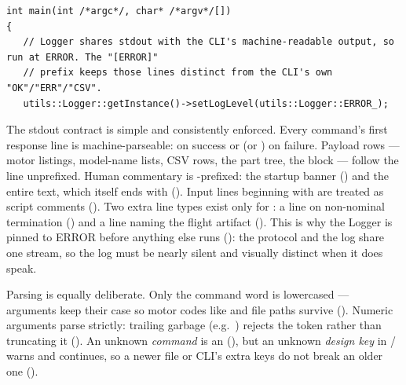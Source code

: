 \begin{listing}[htbp]
\begin{verbatim}
int main(int /*argc*/, char* /*argv*/[])
{
   // Logger shares stdout with the CLI's machine-readable output, so run at ERROR. The "[ERROR]"
   // prefix keeps those lines distinct from the CLI's own "OK"/"ERR"/"CSV".
   utils::Logger::getInstance()->setLogLevel(utils::Logger::ERROR_);
\end{verbatim}
\caption{The CLI's first act is pinning the Logger to ERROR: stdout is a protocol surface,
and log chatter would corrupt it. The rest of the 26-line  prints the
\code{\#}-prefixed banner and hands / to the Repl
().}
\label{lst:interfaces-climain}
\end{listing}

The stdout contract is simple and consistently enforced. Every command's first response line
is machine-parseable:  on success or  (or
) on failure. Payload rows --- motor listings, model-name lists, CSV
rows, the part tree, the  block --- follow the  line unprefixed.
Human commentary is \code{\#}-prefixed: the startup banner
() and the entire  text, which itself ends with
 (). Input lines beginning with \code{\#} are treated
as script comments (). Two extra line types exist only for
: a  line on non-nominal termination () and a
 line naming the flight artifact (). This is
why the Logger is pinned to ERROR before anything else runs
(): the protocol and the log share one stream, so the log must be
nearly silent and visually distinct when it does speak.

Parsing is equally deliberate. Only the command word is lowercased --- arguments keep their
case so motor codes like  and file paths survive ().
Numeric arguments parse strictly: trailing garbage (e.g.\ ) rejects the token
rather than truncating it (). An unknown \emph{command} is an
 (), but an unknown \emph{design key} in
/ warns and continues, so a newer file or CLI's extra keys do
not break an older one ().

